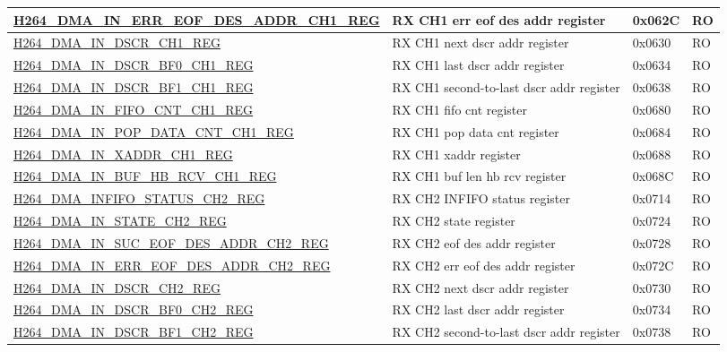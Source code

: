 \begin{longtable}{ | p{7.5cm} | p{5.7cm} | p{1.2cm} | p{1cm} | }
    \hyperref[regdesc:H264DMAINERREOFDESADDRCH1REG]{H264\_DMA\_IN\_ERR\_EOF\_DES\_ADDR\_CH1\_REG} & RX CH1 err eof des addr register & 0x062C & RO \\ \hline
    \hyperref[regdesc:H264DMAINDSCRCH1REG]{H264\_DMA\_IN\_DSCR\_CH1\_REG} & RX CH1 next dscr addr register & 0x0630 & RO \\ \hline
    \hyperref[regdesc:H264DMAINDSCRBF0CH1REG]{H264\_DMA\_IN\_DSCR\_BF0\_CH1\_REG} & RX CH1 last dscr addr register & 0x0634 & RO \\ \hline
    \hyperref[regdesc:H264DMAINDSCRBF1CH1REG]{H264\_DMA\_IN\_DSCR\_BF1\_CH1\_REG} & RX CH1 second-to-last dscr addr register & 0x0638 & RO \\ \hline
    \hyperref[regdesc:H264DMAINFIFOCNTCH1REG]{H264\_DMA\_IN\_FIFO\_CNT\_CH1\_REG} & RX CH1 fifo cnt register & 0x0680 & RO \\ \hline
    \hyperref[regdesc:H264DMAINPOPDATACNTCH1REG]{H264\_DMA\_IN\_POP\_DATA\_CNT\_CH1\_REG} & RX CH1 pop data cnt register & 0x0684 & RO \\ \hline
    \hyperref[regdesc:H264DMAINXADDRCH1REG]{H264\_DMA\_IN\_XADDR\_CH1\_REG} & RX CH1 xaddr register & 0x0688 & RO \\ \hline
    \hyperref[regdesc:H264DMAINBUFHBRCVCH1REG]{H264\_DMA\_IN\_BUF\_HB\_RCV\_CH1\_REG} & RX CH1 buf len hb rcv register & 0x068C & RO \\ \hline
    \hyperref[regdesc:H264DMAINFIFOSTATUSCH2REG]{H264\_DMA\_INFIFO\_STATUS\_CH2\_REG} & RX CH2 INFIFO status register & 0x0714 & RO \\ \hline
    \hyperref[regdesc:H264DMAINSTATECH2REG]{H264\_DMA\_IN\_STATE\_CH2\_REG} & RX CH2 state register & 0x0724 & RO \\ \hline
    \hyperref[regdesc:H264DMAINSUCEOFDESADDRCH2REG]{H264\_DMA\_IN\_SUC\_EOF\_DES\_ADDR\_CH2\_REG} & RX CH2 eof des addr register & 0x0728 & RO \\ \hline
    \hyperref[regdesc:H264DMAINERREOFDESADDRCH2REG]{H264\_DMA\_IN\_ERR\_EOF\_DES\_ADDR\_CH2\_REG} & RX CH2 err eof des addr register & 0x072C & RO \\ \hline
    \hyperref[regdesc:H264DMAINDSCRCH2REG]{H264\_DMA\_IN\_DSCR\_CH2\_REG} & RX CH2 next dscr addr register & 0x0730 & RO \\ \hline
    \hyperref[regdesc:H264DMAINDSCRBF0CH2REG]{H264\_DMA\_IN\_DSCR\_BF0\_CH2\_REG} & RX CH2 last dscr addr register & 0x0734 & RO \\ \hline
    \hyperref[regdesc:H264DMAINDSCRBF1CH2REG]{H264\_DMA\_IN\_DSCR\_BF1\_CH2\_REG} & RX CH2 second-to-last dscr addr register & 0x0738 & RO \\ \hline

\end{longtable}
